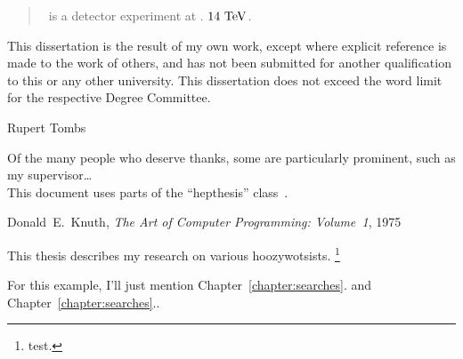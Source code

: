 

\begin{abstract}
\atlas\ is a detector experiment at \cern. $14~\eV[T]$.
\end{abstract}


\begin{declaration}
This dissertation is the result of my own work, except where explicit
reference is made to the work of others, and has not been submitted
for another qualification to this or any other university. This
dissertation does not exceed the word limit for the respective Degree
Committee.
\vspace*{1cm}
\begin{flushright}
Rupert Tombs
\end{flushright}
\end{declaration}


\begin{acknowledgements}
Of the many people who deserve thanks, some are particularly prominent,
such as my supervisor\dots
\\
This document uses parts of the ``hepthesis'' class~\cite{hepthesis}.
\end{acknowledgements}


\begin{preface}
\begin{singlespacing}
\begin{epigraphs}
%
{Donald~E.~Knuth,
\textit{The Art of Computer Programming: Volume~1},
1975~\cite{knuth1975art}}
\end{epigraphs}
\end{singlespacing}


This thesis describes my research on various hoozywotsists.%
\footnote{test.}

\noindent
For this example, I'll just mention Chapter~\ref{chapter:searches}.
and Chapter~\ref{chapter:searches}..
\end{preface}


\tableofcontents


\thispagestyle{empty}

